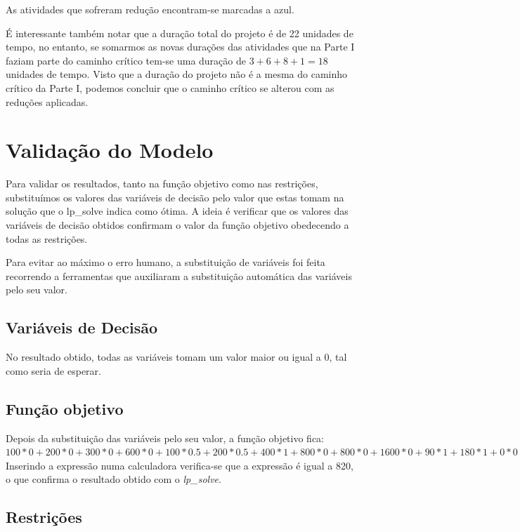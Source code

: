 As atividades que sofreram redução encontram-se marcadas a azul.

É interessante também notar que a duração total do projeto é de 22 unidades de tempo, no entanto, se somarmos as novas durações das atividades que na Parte I faziam parte do caminho crítico tem-se uma duração de $3+6+8+1=18$ unidades de tempo. Visto que a duração do projeto não é a mesma do caminho crítico da Parte I, podemos concluir que o caminho crítico se alterou com as reduções aplicadas.

\section{Validação do Modelo}

Para validar os resultados, tanto na função objetivo como nas restrições,
substituímos os valores das variáveis de decisão pelo valor que estas tomam na
solução que o lp\_solve indica como ótima. A ideia é verificar que os valores das
variáveis de decisão obtidos confirmam o valor da função objetivo obedecendo
a todas as restrições.

Para evitar ao máximo o erro humano, a substituição de variáveis foi feita
recorrendo a ferramentas que auxiliaram a substituição automática das variáveis
pelo seu valor.

\subsection{Variáveis de Decisão}

No resultado obtido, todas as variáveis tomam um valor maior ou igual a 0, tal
como seria de esperar.

\subsection{Função objetivo}

Depois da substituição das variáveis pelo seu valor, a função objetivo
fica:\\

$100*0+200*0+300*0+600*0+100*0.5+200*0.5+400*1+800*0+800*0+
1600*0+90*1+180*1+0*0+0*0+0*0+0*0+500*0+1000*0+300*0+600*0$\\

Inserindo a expressão numa calculadora verifica-se que a expressão é igual a 820,
o que confirma o resultado obtido com o \textit{lp\_solve}.

\subsection{Restrições}

